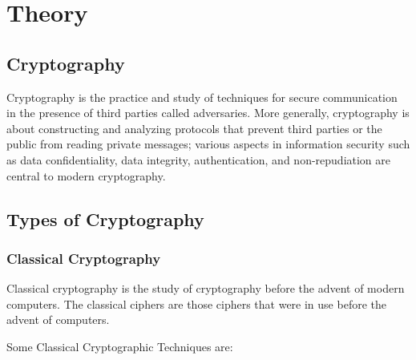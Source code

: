 \documentclass[openany]{book}
\begin{document}
\section{Theory}

\subsection{Cryptography}

Cryptography is the practice and study of techniques for secure communication in the presence of third parties called adversaries. More generally, cryptography is about constructing and analyzing protocols that prevent third parties or the public from reading private messages; various aspects in information security such as data confidentiality, data integrity, authentication, and non-repudiation are central to modern cryptography. \\

\subsection{Types of Cryptography}

\subsubsection{Classical Cryptography}

Classical cryptography is the study of cryptography before the advent of modern computers. The classical ciphers are those ciphers that were in use before the advent of computers.

Some Classical Cryptographic Techniques are:
\end{document}
